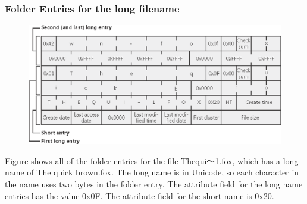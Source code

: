 % 
\begin{frame}[fragile]
    \frametitle{Folder Entries for the long filename}
\begin{figure}
    \includegraphics[width=0.6\linewidth]{figs/FAT-filename.png}
    \end{figure} \pause

    Figure shows all of the folder entries for the file {\color{red}Thequi～1.fox}, which has a long name of {\color{red}The quick brown.fox}. The long name is in Unicode, so each character in the name uses two bytes in the folder entry. The {\color{red}attribute field} for the long name entries has the value {\color{red}0x0F}. The attribute field for the short name is {\color{red}0x20}.
\end{frame}

\fi
% 
% 

